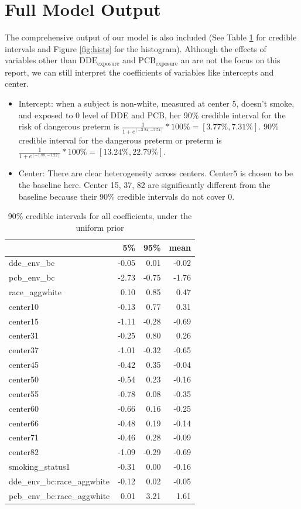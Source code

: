 \documentclass[10pt]{jmlr}%
\begin{document}
\section{Full Model Output}
The comprehensive output of our model is also included (See Table \ref{tab:fullcoef} for credible intervals and Figure \ref{fig:hists} for the histogram). Although the effects of variables other than $\text{DDE}_{\text{exposure}}$ and $\text{PCB}_{\text{exposure}}$ an are not the focus on this report, we can still interpret the coefficients of variables like intercepts and center. 
\begin{itemize}
	\item Intercept: when a subject is non-white, measured at center 5, doesn't smoke, and exposed to 0 level of DDE and PCB, her 90\% credible interval for the risk of dangerous preterm is $\frac{1}{1+e^{[-3.24, -2.54]}}*100\%=[3.77\%, 7.31\%]$.  90\% credible interval for the dangerous preterm or preterm is $\frac{1}{1+e^{[-1.88, -1.22]}}*100\%=[13.24\%, 22.79\%]$.
	
	\item Center: There are clear heterogeneity across centers. Center$5$ is chosen to be the baseline here. Center 15, 37, 82 are significantly different from the baseline because their 90\% credible intervals do not cover 0.
\end{itemize}

\begin{table}
	\begin{tabular}{lrrr}
		\toprule
		 & 5\% & 95\% & mean\\
		\midrule
		dde\_env\_bc & -0.05 & 0.01 & -0.02\\
		pcb\_env\_bc & -2.73 & -0.75 & -1.76\\
		race\_aggwhite & 0.10 & 0.85 & 0.47\\
		center10 & -0.13 & 0.77 & 0.31\\
		center15 & -1.11 & -0.28 & -0.69\\
		\addlinespace
		center31 & -0.25 & 0.80 & 0.26\\
		center37 & -1.01 & -0.32 & -0.65\\
		center45 & -0.42 & 0.35 & -0.04\\
		center50 & -0.54 & 0.23 & -0.16\\
		center55 & -0.78 & 0.08 & -0.35\\
		\addlinespace
		center60 & -0.66 & 0.16 & -0.25\\
		center66 & -0.48 & 0.19 & -0.14\\
		center71 & -0.46 & 0.28 & -0.09\\
		center82 & -1.09 & -0.29 & -0.69\\
		smoking\_status1 & -0.31 & 0.00 & -0.16\\
		\addlinespace
		dde\_env\_bc:race\_aggwhite & -0.12 & 0.02 & -0.05\\
		pcb\_env\_bc:race\_aggwhite & 0.01 & 3.21 & 1.61\\
		\bottomrule
		\end{tabular}
	\label{tab:fullcoef}
	\caption{90\% credible intervals for all coefficients, under the uniform prior}
\end{table}
\end{document}
